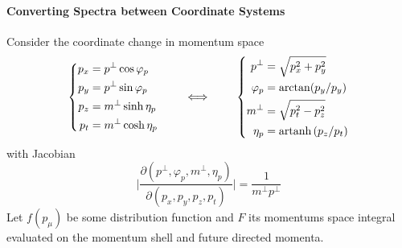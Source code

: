 \paragraph{Converting Spectra between Coordinate Systems}

Consider the coordinate change in momentum space
\begin{equation}
    \left\{
    \begin{split}
        p_x&=p^\perp\cos\varphi_p\\
        p_y&=p^\perp\sin\varphi_p\\
        p_z&=m^\perp\sinh\eta_p\\
        p_t&=m^\perp\cosh\eta_p
    \end{split}
    \right.\qquad\iff\qquad
    \left\{
    \begin{split}
        p^\perp&=\sqrt{p_x^2+p_y^2}\\
        \varphi_p&=\arctan(p_y/p_y)\\
        m^\perp&=\sqrt{p_t^2-p_z^2}\\
        \eta_p&={\text{artanh}\,}(p_z/p_t)
    \end{split}
    \right.
\end{equation}
with Jacobian
\begin{equation}
    \big\vert\frac{\partial(p^\perp,\varphi_p,m^\perp,\eta_p)}{\partial(p_x,p_y,p_z,p_t)}\big\vert=\frac{1}{m^\perp p^\perp}
\end{equation}
Let $f(p_\mu)$ be some distribution function and $F$ its momentums space integral evaluated on the momentum shell and future directed momenta.

